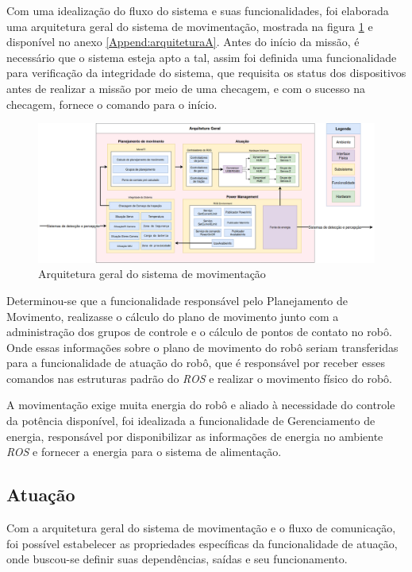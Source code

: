 Com uma idealização do fluxo do sistema e suas funcionalidades, foi elaborada uma arquitetura geral do sistema de movimentação, mostrada na figura \ref{fig:arq_geral} e disponível no anexo \ref{Append:arquiteturaA}.  Antes do início da missão, é necessário que o sistema esteja apto a tal, assim foi definida uma funcionalidade para verificação da integridade do sistema, que requisita os status dos dispositivos antes de realizar a missão por meio de uma checagem, e com o sucesso na checagem, fornece o comando para o início.

\begin{figure}[H]
	\centering
	\includegraphics[scale=0.25]{Figures/ArquiteturaPORTUGUES.png}
	\caption{Arquitetura geral do sistema de movimentação}
	\label{fig:arq_geral}
\end{figure}
Determinou-se que a funcionalidade responsável pelo Planejamento de Movimento, realizasse o cálculo do plano de movimento junto com a administração dos grupos de controle e o cálculo de pontos de contato no robô. Onde essas informações sobre o plano de movimento do robô seriam transferidas para a funcionalidade de atuação do robô, que é responsável por receber esses comandos nas estruturas padrão do \textit{ROS} e realizar o movimento físico do robô.

A movimentação exige muita energia do robô e aliado à necessidade do controle da potência disponível, foi idealizada a funcionalidade de Gerenciamento de energia, responsável por disponibilizar as informações de energia no ambiente \textit{ROS} e fornecer a energia para o sistema de alimentação.

\subsection{Atuação}\label{sec:actuation}
Com a arquitetura geral do sistema de movimentação e o fluxo de comunicação, foi possível estabelecer as propriedades específicas da funcionalidade de atuação, onde buscou-se definir suas dependências, saídas e seu funcionamento.

